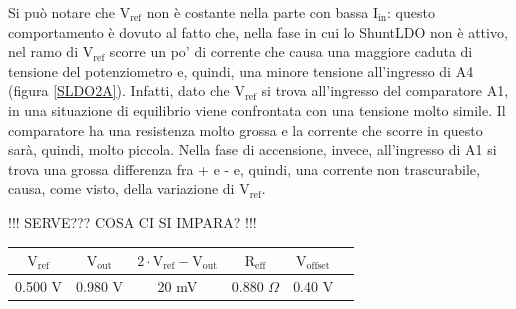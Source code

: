 Si può notare che $\mathrm{V_{ref}}$ non è costante nella parte con bassa $\mathrm{I_{in}}$: questo comportamento è dovuto al fatto che, nella fase in cui lo ShuntLDO non è attivo, nel ramo di $\mathrm{V_{ref}}$ scorre un po' di corrente che causa una maggiore caduta di tensione del potenziometro e, quindi, una minore tensione all'ingresso di A4 (figura \ref{SLDO2A}).
Infatti, dato che $\mathrm{V_{ref}}$ si trova all'ingresso del comparatore A1, in una situazione di equilibrio viene confrontata con una tensione molto simile.
Il comparatore ha una resistenza molto grossa e la corrente che scorre in questo sarà, quindi, molto piccola.
Nella fase di accensione, invece, all'ingresso di A1 si trova una grossa differenza fra + e - e, quindi, una corrente non trascurabile, causa, come visto, della variazione di $\mathrm{V_{ref}}$.

\par \begin{center} !!! SERVE??? COSA CI SI IMPARA? !!! \end{center} \par
\begin{center}
\begin{tabular}{cccccc}
\hline
$\mathrm{V_{ref}}$ & $\mathrm{V_{out}}$ & $\mathrm{2 \cdot V_{ref}- V_{out}}$ & $\mathrm{R_{eff}}$ & $\mathrm{V_{offset}}$ \\
\hline
0.500 V & 0.980 V & 20 mV & 0.880 $\Omega$ & 0.40 V\\
\hline
\end{tabular}
\end{center}
\FloatBarrier

